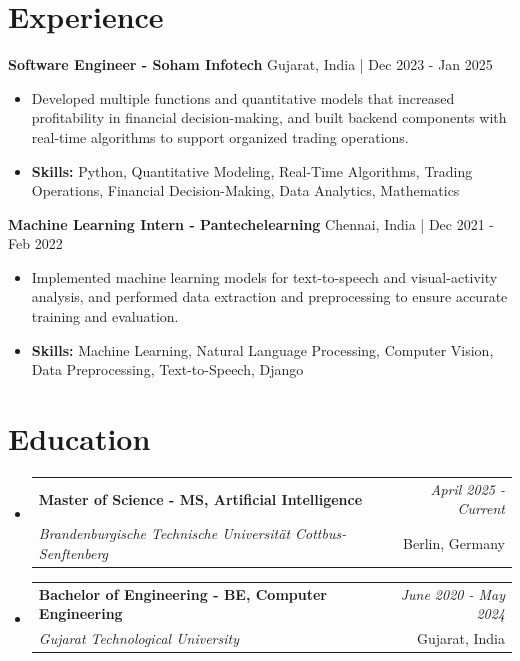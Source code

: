 \documentclass[a4paper,11pt]{article}
\makeatletter
\newcommand{\resumeSubheading}[4]{
\vspace{0.5mm}\item
    \begin{tabular*}{0.98\textwidth}[t]{l@{\extracolsep{\fill}}r}
        \textbf{#1} & \textit{\footnotesize{#4}} \\
        \textit{\footnotesize{#3}} &  \footnotesize{#2}\\
    \end{tabular*}
    \vspace{-2.4mm}
}
\makeatother
\begin{document}
\section{\textbf{Experience}}


\vspace{1mm}
  \textbf{Software Engineer - Soham Infotech} \hfill Gujarat, India | Dec 2023 - Jan 2025
\vspace{-1.5mm} %
\begin{itemize}
  \item Developed multiple functions and quantitative models that increased profitability in financial decision-making, and built backend components with real-time algorithms to support organized trading operations.

\vspace{-2mm}
  \item \textbf{Skills:} Python, Quantitative Modeling, Real-Time Algorithms, Trading Operations, Financial Decision-Making, Data Analytics, Mathematics
\end{itemize}

\vspace{1mm}
  \textbf{Machine Learning Intern - Pantechelearning} \hfill Chennai, India | Dec 2021 - Feb 2022
\vspace{-1.5mm} %
\begin{itemize}
  \item Implemented machine learning models for text-to-speech and visual-activity analysis, and performed data extraction and preprocessing to ensure accurate training and evaluation.
\vspace{-2mm}
  \item \textbf{Skills:} Machine Learning, Natural Language Processing, Computer Vision, Data Preprocessing, Text-to-Speech, Django
\end{itemize}\section{\textbf{Education}}
\vspace{-0.4mm}

\begin{itemize}
\resumeSubheading
{Master of Science - MS, Artificial Intelligence }{Berlin, Germany}
{Brandenburgische Technische Universität Cottbus-Senftenberg  }{April 2025 - Current}

\vspace{1.0mm} %
\resumeSubheading
{Bachelor of Engineering - BE, Computer Engineering  }{Gujarat, India}
{Gujarat Technological University }{June 2020 - May 2024}

\end{itemize}
\end{document}
